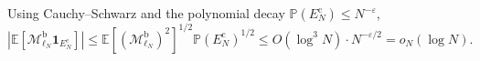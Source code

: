Using Cauchy--Schwarz and the polynomial decay $\mathbb P(E_N^{\mathrm c})\le N^{-\varepsilon}$,
\[
    \left|\mathbb E\!\left[\mathcal M_{\ell_N}^{\mathrm b}\mathbf 1_{E_N^{\mathrm c}}\right]\right|
    \le
    \mathbb E\!\left[(\mathcal M_{\ell_N}^{\mathrm b})^2\right]^{1/2}\mathbb P(E_N^{\mathrm c})^{1/2}
    \le
    O(\log^3 N)\cdot N^{-\varepsilon/2}
    =
    o_N(\log N).
\]

